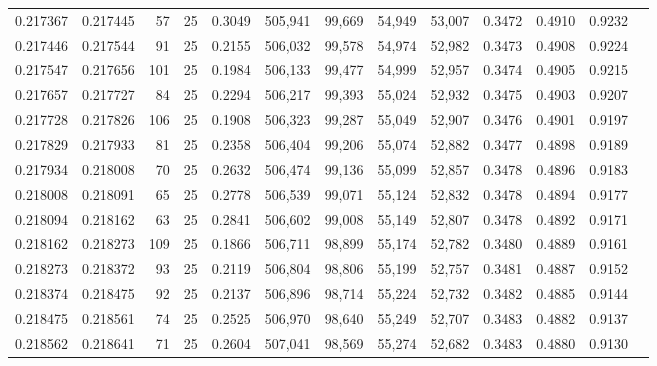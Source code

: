\begin{tabular}{rrrrrrrrrrrrr}
0.217367 & 0.217445 &    57 &  25 &                                     0.3049 & 505,941 &  99,669 &  54,949 &  53,007 & 0.3472 & 0.4910 & 0.9232 \\
0.217446 & 0.217544 &    91 &  25 &                                     0.2155 & 506,032 &  99,578 &  54,974 &  52,982 & 0.3473 & 0.4908 & 0.9224 \\
0.217547 & 0.217656 &   101 &  25 &                                     0.1984 & 506,133 &  99,477 &  54,999 &  52,957 & 0.3474 & 0.4905 & 0.9215 \\
0.217657 & 0.217727 &    84 &  25 &                                     0.2294 & 506,217 &  99,393 &  55,024 &  52,932 & 0.3475 & 0.4903 & 0.9207 \\
0.217728 & 0.217826 &   106 &  25 &                                     0.1908 & 506,323 &  99,287 &  55,049 &  52,907 & 0.3476 & 0.4901 & 0.9197 \\
0.217829 & 0.217933 &    81 &  25 &                                     0.2358 & 506,404 &  99,206 &  55,074 &  52,882 & 0.3477 & 0.4898 & 0.9189 \\
0.217934 & 0.218008 &    70 &  25 &                                     0.2632 & 506,474 &  99,136 &  55,099 &  52,857 & 0.3478 & 0.4896 & 0.9183 \\
0.218008 & 0.218091 &    65 &  25 &                                     0.2778 & 506,539 &  99,071 &  55,124 &  52,832 & 0.3478 & 0.4894 & 0.9177 \\
0.218094 & 0.218162 &    63 &  25 &                                     0.2841 & 506,602 &  99,008 &  55,149 &  52,807 & 0.3478 & 0.4892 & 0.9171 \\
0.218162 & 0.218273 &   109 &  25 &                                     0.1866 & 506,711 &  98,899 &  55,174 &  52,782 & 0.3480 & 0.4889 & 0.9161 \\
0.218273 & 0.218372 &    93 &  25 &                                     0.2119 & 506,804 &  98,806 &  55,199 &  52,757 & 0.3481 & 0.4887 & 0.9152 \\
0.218374 & 0.218475 &    92 &  25 &                                     0.2137 & 506,896 &  98,714 &  55,224 &  52,732 & 0.3482 & 0.4885 & 0.9144 \\
0.218475 & 0.218561 &    74 &  25 &                                     0.2525 & 506,970 &  98,640 &  55,249 &  52,707 & 0.3483 & 0.4882 & 0.9137 \\
0.218562 & 0.218641 &    71 &  25 &                                     0.2604 & 507,041 &  98,569 &  55,274 &  52,682 & 0.3483 & 0.4880 & 0.9130 \\

\end{tabular}
